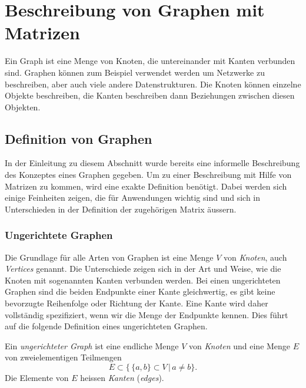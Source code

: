 %
%
%
\section{Beschreibung von Graphen mit Matrizen
\label{buch:section:beschreibung-von-graphen-mit-matrizen}}
Ein Graph ist eine Menge von Knoten, die untereinander mit Kanten
verbunden sind.
Graphen können zum Beispiel verwendet werden um Netzwerke zu beschreiben,
aber auch viele andere Datenstrukturen.
Die Knoten können einzelne Objekte beschreiben, die Kanten beschreiben
dann Beziehungen zwischen diesen Objekten.

\subsection{Definition von Graphen
\label{subsection:definition-von-graphen}}
In der Einleitung zu diesem Abschnitt wurde bereits eine informelle
Beschreibung des Konzeptes eines Graphen gegeben.
Um zu einer Beschreibung mit Hilfe von Matrizen zu kommen,
wird eine exakte Definition benötigt.
Dabei werden sich einige Feinheiten zeigen, die für Anwendungen wichtig
sind und sich in Unterschieden in der Definition der zugehörigen Matrix 
äussern.

\subsubsection{Ungerichtete Graphen}
Die Grundlage für alle Arten von Graphen ist eine Menge $V$ von {\em Knoten},
auch {\em Vertices} genannt.
%
%
Die Unterschiede zeigen sich in der Art und Weise, wie die Knoten
mit sogenannten Kanten
%
verbunden werden.
Bei einen ungerichteten Graphen sind die beiden Endpunkte einer Kante
gleichwertig, es gibt keine bevorzugte Reihenfolge oder Richtung der
Kante.
Eine Kante wird daher vollständig spezifiziert, wenn wir die
Menge der Endpunkte kennen.
Dies führt auf die folgende Definition eines ungerichteten Graphen.

\begin{definition}
\label{buch:def:ungerichteter-graph}
%
%
Ein {\em ungerichteter Graph} ist eine endliche Menge $V$ von {\em Knoten}
und eine Menge $E$ von zweielementigen Teilmengen 
\[
E \subset \{\, \{a,b\}\subset V\,|\, a\ne b\}.
\]
Die Elemente von $E$ heissen {\em Kanten} ({\em edges}).
\end{definition}

